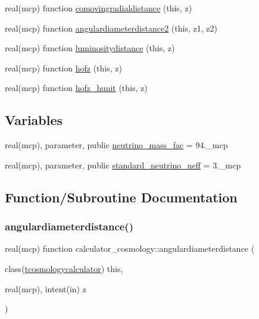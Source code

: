 \begin{DoxyCompactItemize}
\item 
real(mcp) function \mbox{\hyperlink{namespacecalculator__cosmology_a56ce70cf463f7c6df9c6d59a9459b993}{comovingradialdistance}} (this, z)
\item 
real(mcp) function \mbox{\hyperlink{namespacecalculator__cosmology_a3a138f6f81a4341d3017e38fce77b905}{angulardiameterdistance2}} (this, z1, z2)
\item 
real(mcp) function \mbox{\hyperlink{namespacecalculator__cosmology_a0b1cc6537ad803bf83a690a40c4e1550}{luminositydistance}} (this, z)
\item 
real(mcp) function \mbox{\hyperlink{namespacecalculator__cosmology_a04681553ca8acc12385e91c6b720105a}{hofz}} (this, z)
\item 
real(mcp) function \mbox{\hyperlink{namespacecalculator__cosmology_aabad31ec70f213aae297f0c1d31880fc}{hofz\+\_\+hunit}} (this, z)
\end{DoxyCompactItemize}
\subsection*{Variables}
\begin{DoxyCompactItemize}
\item 
real(mcp), parameter, public \mbox{\hyperlink{namespacecalculator__cosmology_a9199e46da0bd753de17a9be358823ee0}{neutrino\+\_\+mass\+\_\+fac}} = 94.\+\_\+mcp
\item 
real(mcp), parameter, public \mbox{\hyperlink{namespacecalculator__cosmology_a807c6e74e20e797dcbf2cd848b181a95}{standard\+\_\+neutrino\+\_\+neff}} = 3.\+\_\+mcp
\end{DoxyCompactItemize}


\subsection{Function/\+Subroutine Documentation}
\mbox{\label{namespacecalculator__cosmology_a703b9e272151719cca42f7d37d7d403f}} 
\subsubsection{\texorpdfstring{angulardiameterdistance()}{angulardiameterdistance()}}
{\footnotesize\ttfamily real(mcp) function calculator\+\_\+cosmology\+::angulardiameterdistance (\begin{DoxyParamCaption}\item[{class(\mbox{\hyperlink{structcalculator__cosmology_1_1tcosmologycalculator}{tcosmologycalculator}})}]{this,  }\item[{real(mcp), intent(in)}]{z }\end{DoxyParamCaption})\hspace{0.3cm}{\ttfamily [private]}}


